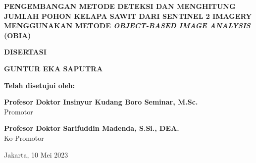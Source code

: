 \newpage
{}


\begin{center}
	
	\textbf{{\fontsize{12}{15}\selectfont PENGEMBANGAN METODE DETEKSI DAN MENGHITUNG JUMLAH POHON KELAPA SAWIT DARI SENTINEL 2 IMAGERY MENGGUNAKAN METODE \textit{OBJECT-BASED IMAGE ANALYSIS} (OBIA)}}\\
	
 
	\vspace{2cm}
	
	\textbf{{\normalsize DISERTASI}}
	
	\vspace{2cm}
	
	\textbf{{\normalsize GUNTUR EKA SAPUTRA}}
	
	
	
	\vspace{2cm}
		
	\textbf{Telah disetujui oleh:}
	
	\vspace{2cm}
	
	{\bf Profesor Doktor Insinyur Kudang Boro Seminar, M.Sc.}\\
	Promotor
	
	\vspace{2cm}
	
	{\bf Profesor Doktor Sarifuddin Madenda, S.Si., DEA.}\\
	Ko-Promotor
	
	\vspace{2cm}
	
	Jakarta, 10 Mei 2023
	
\end{center}